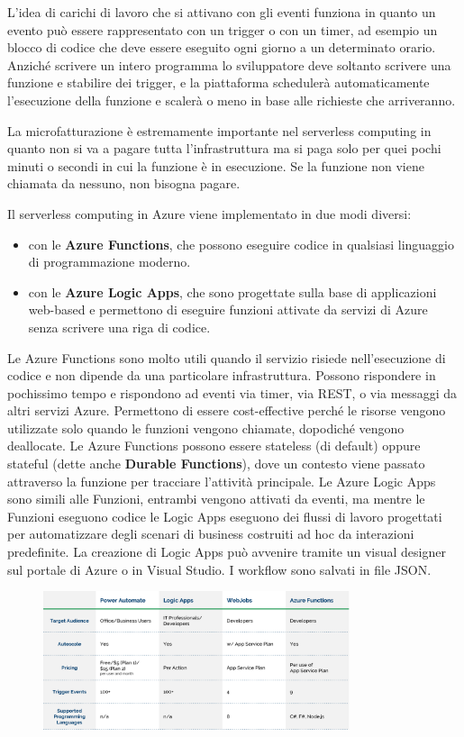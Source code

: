 L'idea di carichi di lavoro che si attivano con gli eventi funziona in quanto un evento può essere rappresentato con un trigger o con un timer, ad esempio un blocco di codice che deve essere eseguito ogni giorno a un determinato orario. Anziché scrivere un intero programma lo sviluppatore deve soltanto scrivere una funzione e stabilire dei trigger, e la piattaforma schedulerà automaticamente l'esecuzione della funzione e scalerà o meno in base alle richieste che arriveranno.

La microfatturazione è estremamente importante nel serverless computing in quanto non si va a pagare tutta l'infrastruttura ma si paga solo per quei pochi minuti o secondi in cui la funzione è in esecuzione. Se la funzione non viene chiamata da nessuno, non bisogna pagare.

\vspace{5mm}

Il serverless computing in Azure viene implementato in due modi diversi:
\begin{itemize}
    \item con le \textbf{Azure Functions}, che possono eseguire codice in qualsiasi linguaggio di programmazione moderno.
    \item con le \textbf{Azure Logic Apps}, che sono progettate sulla base di applicazioni web-based e permettono di eseguire funzioni attivate da servizi di Azure senza scrivere una riga di codice.
\end{itemize}
Le Azure Functions sono molto utili quando il servizio risiede nell'esecuzione di codice e non dipende da una particolare infrastruttura. Possono rispondere in pochissimo tempo e rispondono ad eventi via timer, via REST, o via messaggi da altri servizi Azure. Permettono di essere cost-effective perché le risorse vengono utilizzate solo quando le funzioni vengono chiamate, dopodiché vengono deallocate. Le Azure Functions possono essere stateless (di default) oppure stateful (dette anche \textbf{Durable Functions}), dove un contesto viene passato attraverso la funzione per tracciare l'attività principale. Le Azure Logic Apps sono simili alle Funzioni, entrambi vengono attivati da eventi, ma mentre le Funzioni eseguono codice le Logic Apps eseguono dei flussi di lavoro progettati per automatizzare degli scenari di business costruiti ad hoc da interazioni predefinite. La creazione di Logic Apps può avvenire tramite un visual designer sul portale di Azure o in Visual Studio. I workflow sono salvati in file JSON.

\begin{figure}[htb!]
    \centering
    \includegraphics[width=9cm]{./Images/cap14/14.4.png}
\end{figure}


